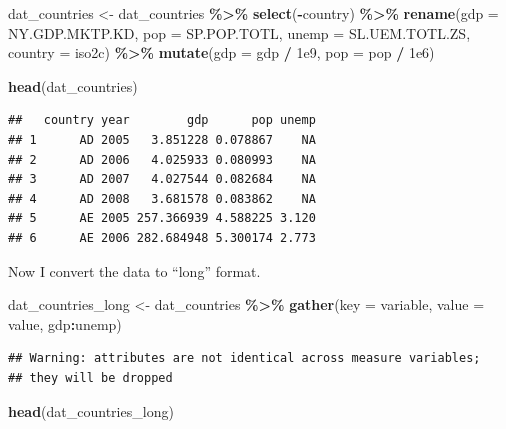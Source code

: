 \documentclass[
  12pt,
  oneside,openany]{book}
\newenvironment{Shaded}{\begin{snugshade}}{\end{snugshade}}
\newcommand{\DataTypeTok}[1]{\textcolor[rgb]{0.13,0.29,0.53}{#1}}
\newcommand{\FloatTok}[1]{\textcolor[rgb]{0.00,0.00,0.81}{#1}}
\newcommand{\KeywordTok}[1]{\textcolor[rgb]{0.13,0.29,0.53}{\textbf{#1}}}
\newcommand{\NormalTok}[1]{#1}
\newcommand{\OperatorTok}[1]{\textcolor[rgb]{0.81,0.36,0.00}{\textbf{#1}}}
\newcommand{\StringTok}[1]{\textcolor[rgb]{0.31,0.60,0.02}{#1}}
\begin{document}
\begin{Shaded}
\begin{Highlighting}[]
\NormalTok{dat\_countries <{-}}\StringTok{ }\NormalTok{dat\_countries }\OperatorTok{\%>\%}
\StringTok{  }\KeywordTok{select}\NormalTok{(}\OperatorTok{{-}}\NormalTok{country) }\OperatorTok{\%>\%}
\StringTok{  }\KeywordTok{rename}\NormalTok{(}\DataTypeTok{gdp =}\NormalTok{ NY.GDP.MKTP.KD,}
         \DataTypeTok{pop =}\NormalTok{ SP.POP.TOTL,}
         \DataTypeTok{unemp =}\NormalTok{ SL.UEM.TOTL.ZS,}
         \DataTypeTok{country =}\NormalTok{ iso2c) }\OperatorTok{\%>\%}
\StringTok{  }\KeywordTok{mutate}\NormalTok{(}\DataTypeTok{gdp =}\NormalTok{ gdp }\OperatorTok{/}\StringTok{ }\FloatTok{1e9}\NormalTok{,}
         \DataTypeTok{pop =}\NormalTok{ pop }\OperatorTok{/}\StringTok{ }\FloatTok{1e6}\NormalTok{)}

\KeywordTok{head}\NormalTok{(dat\_countries)}
\end{Highlighting}
\end{Shaded}

\begin{verbatim}
##   country year        gdp      pop unemp
## 1      AD 2005   3.851228 0.078867    NA
## 2      AD 2006   4.025933 0.080993    NA
## 3      AD 2007   4.027544 0.082684    NA
## 4      AD 2008   3.681578 0.083862    NA
## 5      AE 2005 257.366939 4.588225 3.120
## 6      AE 2006 282.684948 5.300174 2.773
\end{verbatim}

Now I convert the data to ``long'' format.

\begin{Shaded}
\begin{Highlighting}[]
\NormalTok{dat\_countries\_long <{-}}\StringTok{ }\NormalTok{dat\_countries }\OperatorTok{\%>\%}
\StringTok{  }\KeywordTok{gather}\NormalTok{(}\DataTypeTok{key =}\NormalTok{ variable,}
         \DataTypeTok{value =}\NormalTok{ value,}
\NormalTok{         gdp}\OperatorTok{:}\NormalTok{unemp)}
\end{Highlighting}
\end{Shaded}

\begin{verbatim}
## Warning: attributes are not identical across measure variables;
## they will be dropped
\end{verbatim}

\begin{Shaded}
\begin{Highlighting}[]
\KeywordTok{head}\NormalTok{(dat\_countries\_long)}
\end{Highlighting}
\end{Shaded}
\end{document}
